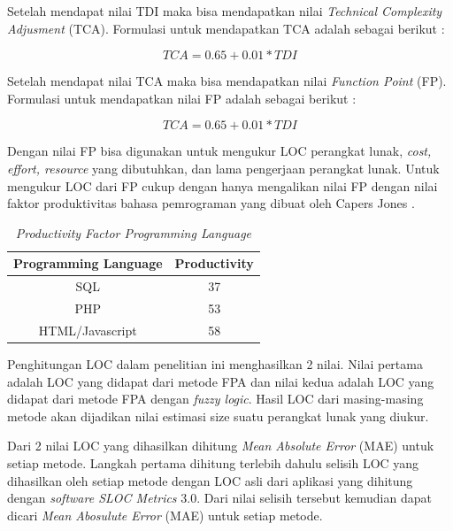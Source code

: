 \documentclass[a4paper]{article}
\begin{document}
\begin{multicols}{2}
\par Setelah mendapat nilai TDI maka bisa mendapatkan nilai \textit{Technical Complexity Adjusment} (TCA). Formulasi untuk mendapatkan TCA adalah sebagai berikut :

\begin{equation}
   TCA = 0.65 + 0.01 * TDI
\end{equation}

\par Setelah mendapat nilai TCA maka bisa mendapatkan nilai \textit{Function Point} (FP). Formulasi untuk mendapatkan nilai FP adalah sebagai berikut :

\begin{equation}
   TCA = 0.65 + 0.01 * TDI
\end{equation}

\par Dengan nilai FP bisa digunakan untuk mengukur LOC perangkat lunak, \textit{cost, effort, resource} yang dibutuhkan, dan lama pengerjaan perangkat lunak. Untuk mengukur LOC dari FP cukup dengan hanya mengalikan nilai FP dengan nilai faktor produktivitas bahasa pemrograman yang dibuat oleh Capers Jones \citep{Tunali2014}.

\begin{table}[H]
    \centering
    \caption{\textit{Productivity Factor Programming Language}}
    \bigskip
    \begin{tabular}{|c|c|}
        \hline
        \textbf{Programming Language} & \textbf{Productivity}\\
        \hline
        SQL & 37\\
        PHP & 53\\
        HTML/Javascript & 58\\
        \hline
    \end{tabular}
    \label{tab5}
\end{table}

\par Penghitungan LOC dalam penelitian ini menghasilkan 2 nilai. Nilai pertama adalah LOC yang didapat dari metode FPA dan nilai kedua adalah LOC yang didapat dari metode FPA dengan \textit{fuzzy logic}. Hasil LOC dari masing-masing metode akan dijadikan nilai estimasi size suatu perangkat lunak yang diukur.

\par Dari 2 nilai LOC yang dihasilkan dihitung \textit{Mean Absolute Error} (MAE) untuk setiap metode. Langkah pertama dihitung terlebih dahulu selisih LOC yang dihasilkan oleh setiap metode dengan LOC asli dari aplikasi yang dihitung dengan \textit{software SLOC Metrics} 3.0. Dari nilai selisih tersebut kemudian dapat dicari \textit{Mean Abosulute Error} (MAE) untuk setiap metode.


\end{multicols}
\end{document}
